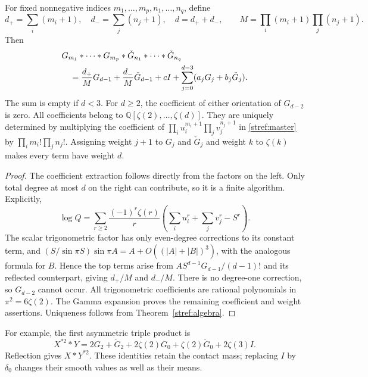 \begin{corollary}
\label{stref:allindices}
For fixed nonnegative indices $m_1,\ldots,m_p,n_1,\ldots,n_q$, define
\[
 d_+=\sum_i(m_i+1),\quad d_-=\sum_j(n_j+1),\quad d=d_++d_-,
 \qquad M=\prod_i(m_i+1)\prod_j(n_j+1).
\]
Then
\begin{align}
 &G_{m_1}*\cdots*G_{m_p}*
  \check G_{n_1}*\cdots*\check G_{n_q}\notag\\
 &\quad=\frac{d_+}{M}G_{d-1}+\frac{d_-}{M}\check G_{d-1}
       +cI+\sum_{j=0}^{d-3}(a_jG_j+b_j\check G_j).
 \label{stref:normal}
\end{align}
The sum is empty if $d<3$. For $d\ge2$, the coefficient of either orientation of
$G_{d-2}$ is zero. All coefficients belong to
$\mathbb Q[\zeta(2),\ldots,\zeta(d)]$.
They are uniquely determined by multiplying the coefficient of
$\prod_i u_i^{m_i+1}\prod_j v_j^{n_j+1}$ in
\eqref{stref:master} by $\prod_i m_i!\prod_j n_j!$.
Assigning weight $j+1$ to $G_j$ and $\check G_j$ and weight $k$ to
$\zeta(k)$ makes every term have weight $d$.
\end{corollary}
\begin{proof}
The coefficient extraction follows directly from the factors on the
left. Only total degree at most $d$ on the right can contribute, so
it is a finite algorithm. Explicitly,
\[
 \log Q=\sum_{r\ge2}\frac{(-1)^r\zeta(r)}r
  \left(\sum_i u_i^r+\sum_jv_j^r-S^r\right).
\]
The scalar trigonometric factor has only even-degree corrections to
its constant term, and
$(S/\sin\pi S)\sin\pi A=A+O((|A|+|B|)^3)$, with the analogous
formula for $B$. Hence the top terms arise from
$A S^{d-1}G_{d-1}/(d-1)!$ and its reflected counterpart, giving
$d_+/M$ and $d_-/M$. There is no degree-one correction, so
$G_{d-2}$ cannot occur. All trigonometric coefficients are rational
polynomials in $\pi^2=6\zeta(2)$. The Gamma expansion proves the
remaining coefficient and weight assertions. Uniqueness follows from
Theorem~\ref{stref:algebra}.
\end{proof}

For example, the first asymmetric triple product is
\begin{equation}\label{stref:triple}
 X^{*2}*Y=2G_2+\check G_2+2\zeta(2)G_0+\zeta(2)\check G_0
                 +2\zeta(3)I.
\end{equation}
Reflection gives $X*Y^{*2}$. These identities retain the contact mass;
replacing $I$ by $\delta_0$ changes their smooth values as well as
their means.

